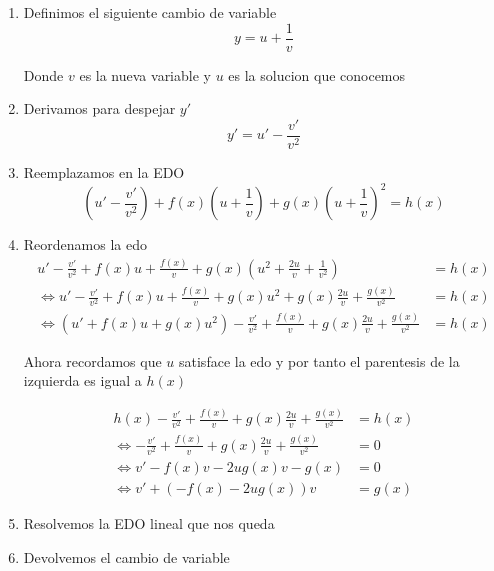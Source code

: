 \documentclass[a4paper,oneside,10.5pt]{article}
\begin{document}
\begin{enumerate}
  \item Definimos el siguiente cambio de variable
        \begin{equation*}
          y = u + \frac{1}{v}
        \end{equation*}

        Donde $v$ es la nueva variable y $u$ es la solucion que conocemos
  \item Derivamos para despejar $y'$
        \begin{equation*}
          y' = u'  - \frac{v'}{v^{2}}
        \end{equation*}

  \item Reemplazamos en la EDO
        \begin{equation*}
          (u' - \frac{v'}{v^{2}}) + f(x)(u + \frac{1}{v}) + g(x)(u + \frac{1}{v})^{2} = h(x)
        \end{equation*}

  \item Reordenamos la edo
        \begin{align*}
          u' - \frac{v'}{v^{2}} + f(x)u + \frac{f(x)}{v} + g(x)(u^{2} + \frac{2u}{v} + \frac{1}{v^{2}}) &= h(x)\\
          \iff u' - \frac{v'}{v^{2}} + f(x)u + \frac{f(x)}{v} + g(x)u^{2} + g(x) \frac{2u}{v} + \frac{g(x)}{v^{2}} &= h(x)\\
          \iff (u' + f(x)u + g(x)u^{2}) - \frac{v'}{v^{2}} + \frac{f(x)}{v} + g(x) \frac{2u}{v} + \frac{g(x)}{v^{2}} &= h(x)
        \end{align*}

        Ahora recordamos que $u$ satisface la edo y por tanto el parentesis de la izquierda es igual a $h(x)$

        \begin{align*}
          h(x) - \frac{v'}{v^{2}} + \frac{f(x)}{v} + g(x) \frac{2u}{v} + \frac{g(x)}{v^{2}} &= h(x)\\
          \iff - \frac{v'}{v^{2}} + \frac{f(x)}{v} + g(x) \frac{2u}{v} + \frac{g(x)}{v^{2}} &= 0\\
          \iff v' - f(x)v - 2u g(x)v- g(x) &= 0\\
          \iff v' + (-f(x) - 2ug(x))v &= g(x)
        \end{align*}
  \item Resolvemos la EDO lineal que nos queda
  \item Devolvemos el cambio de variable
\end{enumerate}
\end{document}
